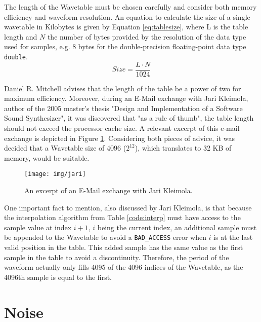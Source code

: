The length of the Wavetable must be chosen carefully and consider both memory efficiency and waveform resolution. An equation to calculate the size of a single wavetable in Kilobytes is given by Equation \ref{eq:tablesize}, where L is the table length and $N$ the number of bytes provided by the resolution of the data type used for samples, e.g. 8 bytes for the double-precision floating-point data type \texttt{double}.
\begin{equation}
  Size = \frac{L \cdot N}{1024}
  \label{eq:tablesize}
\end{equation}

Daniel R. Mitchell advises that the length of the table be a power of two for maximum efficiency.  Moreover, during an E-Mail exchange with Jari Kleimola, author of the 2005 master's thesis "Design and Implementation of a Software Sound Synthesizer", it was discovered that "as a rule of thumb", the table length should not exceed the processor cache size. A relevant excerpt of this e-mail exchange is depicted in Figure \ref{fig:jari}. Considering both pieces of advice, it was decided that a Wavetable size of 4096 ($2^{12}$), which translates to 32 KB of memory, would be suitable.

\begin{figure}
  \texttt{[image: img/jari]}
  \caption{An excerpt of an E-Mail exchange with Jari Kleimola.}
  \label{fig:jari}
\end{figure}

\noindent One important fact to mention, also discussed by Jari Kleimola, is that because the interpolation algorithm from Table \ref{code:interp} must have access to the sample value at index $i+1$, $i$ being the current index, an additional sample must be appended to the Wavetable to avoid a \texttt{BAD\_ACCESS} error when $i$ is at the last valid position in the table. This added sample has the same value as the first sample in the table to avoid a discontinuity. Therefore, the period of the waveform actually only fills 4095 of the 4096 indices of the Wavetable, as the 4096th sample is equal to the first.

\section{Noise}

